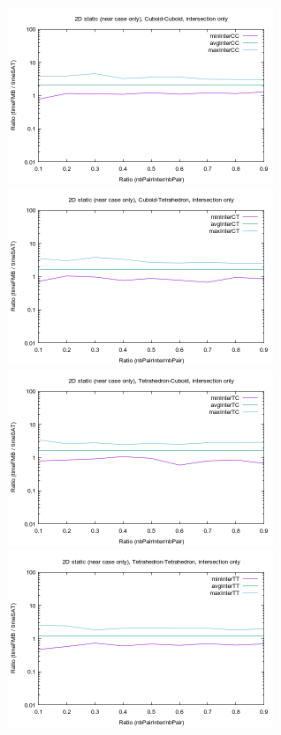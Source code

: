 \documentclass[12pt, a4paper]{article}
\begin{document}
\begin{center}
\begin{figure}[H]
\centering\includegraphics[width=7cm]{../Results/qualification2DCCinterNearCaseOnly.png}
\centering\includegraphics[width=7cm]{../Results/qualification2DCTinterNearCaseOnly.png}
\centering\includegraphics[width=7cm]{../Results/qualification2DTCinterNearCaseOnly.png}
\centering\includegraphics[width=7cm]{../Results/qualification2DTTinterNearCaseOnly.png}
\end{figure}
\end{center}
\end{document}
